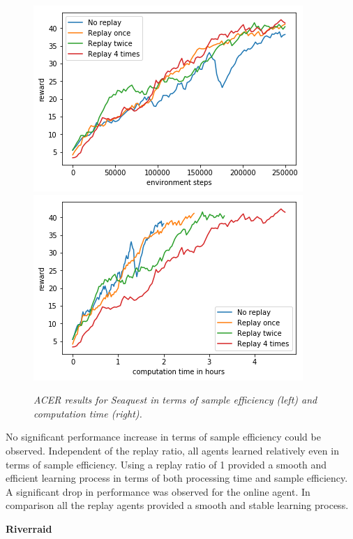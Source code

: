 \begin{figure}[h]
\includegraphics[scale=0.55]{bilder/seaquestbyonline.png}
\includegraphics[scale=0.55]{bilder/seaquestbytime.png}
\caption{\textit{ACER results for Seaquest in terms of sample efficiency (left) and computation time (right).}}
\label{seafig}
\end{figure}


No significant performance increase in terms of sample efficiency could be observed. Independent of the replay ratio, all agents learned relatively even in terms of sample efficiency.
Using a replay ratio of 1 provided a smooth and efficient learning process in terms of both processing time and sample efficiency. \linebreak A significant drop in performance was observed for the online agent. In comparison all the replay agents provided a smooth and stable learning process.
\pagebreak

\begin{center}
\textbf{Riverraid}
\end{center} 

